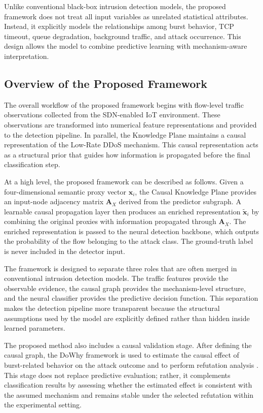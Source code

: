 \documentclass[journal]{IEEEtran}
\begin{document}
Unlike conventional black-box intrusion detection models, the proposed framework does not treat all input variables as unrelated statistical attributes. Instead, it explicitly models the relationships among burst behavior, TCP timeout, queue degradation, background traffic, and attack occurrence. This design allows the model to combine predictive learning with mechanism-aware interpretation.

\subsection{Overview of the Proposed Framework}
\label{subsec:framework_overview}

The overall workflow of the proposed framework begins with flow-level traffic observations collected from the SDN-enabled IoT environment. These observations are transformed into numerical feature representations and provided to the detection pipeline. In parallel, the Knowledge Plane maintains a causal representation of the Low-Rate DDoS mechanism. This causal representation acts as a structural prior that guides how information is propagated before the final classification step.

At a high level, the proposed framework can be described as follows. Given a
four-dimensional semantic proxy vector $\mathbf{x}_i$, the Causal Knowledge
Plane provides an input-node adjacency matrix $\mathbf{A}_{X}$ derived from
the predictor subgraph. A learnable causal propagation layer then produces an
enriched representation $\tilde{\mathbf{x}}_i$ by combining the original
proxies with information propagated through $\mathbf{A}_{X}$. The enriched
representation is passed to the neural detection backbone, which outputs the
probability of the flow belonging to the attack class. The ground-truth label
is never included in the detector input.

The framework is designed to separate three roles that are often merged in conventional intrusion detection models. The traffic features provide the observable evidence, the causal graph provides the mechanism-level structure, and the neural classifier provides the predictive decision function. This separation makes the detection pipeline more transparent because the structural assumptions used by the model are explicitly defined rather than hidden inside learned parameters.

The proposed method also includes a causal validation stage. After defining the causal graph, the DoWhy framework is used to estimate the causal effect of burst-related behavior on the attack outcome and to perform refutation analysis \cite{sharma2020dowhy}. This stage does not replace predictive evaluation; rather, it complements classification results by assessing whether the estimated effect is consistent with the assumed mechanism and remains stable under the selected refutation within the experimental setting.
\end{document}
